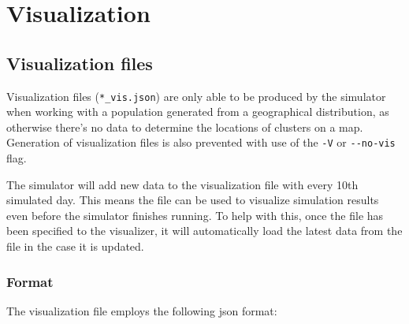 \chapter{Visualization}
\label{chap:visualizer}


\section{Visualization files}
\label{sec:files}

Visualization files (\texttt{*\_vis.json}) are only able to be produced by the simulator when working with a population generated from a geographical distribution, as otherwise there's no data to determine the locations of clusters on a map. Generation of visualization files is also prevented with use of the \texttt{-V} or \texttt{{-}-no-vis} flag.

The simulator will add new data to the visualization file with every 10th simulated day. This means the file can be used to visualize simulation results even before the simulator finishes running. To help with this, once the file has been specified to the visualizer, it will automatically load the latest data from the file in the case it is updated.

\subsection{Format}

The visualization file employs the following json format:

